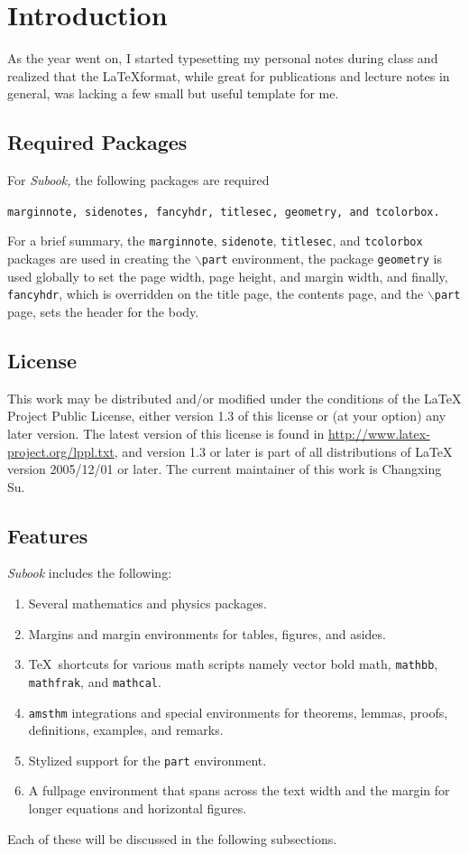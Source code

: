 \chapter{Introduction}
As the year went on, I started typesetting my personal notes during class and realized that the \LaTeX  format, 
while great for publications and lecture notes in general, was lacking a few small but useful template for me.

\section{Required Packages}\label{sec:reqpackages}
For \textit{Subook,} the following packages are required
\begin{center}
    \texttt{marginnote, sidenotes, fancyhdr, titlesec, geometry, and tcolorbox.}
\end{center}
For a brief summary, the \texttt{marginnote}, \texttt{sidenote}, \texttt{titlesec}, 
and \texttt{tcolorbox} packages are used in creating the \texttt{$\backslash$part} environment, 
the package \texttt{geometry} is used globally to set the page width, page height, 
and margin width, and finally, \texttt{fancyhdr}, 
which is overridden on the title page, 
the contents page, and the \texttt{$\backslash$part} page, sets the header for the body.


\section{License}\label{sec:license}
This work may be distributed and/or modified under the conditions of the LaTeX Project Public License, 
either version 1.3 of this license or (at your option) any later version. 
The latest version of this license is found in  \url{http://www.latex-project.org/lppl.txt}, 
and version 1.3 or later is part of all distributions of LaTeX version 2005/12/01 or later. 
The current maintainer of this work is Changxing Su.

\section{Features}\label{sec:Features}

\textit{Subook} includes the following:
	\begin{enumerate}
		\item Several mathematics and physics packages.
		\item Margins and margin environments for tables, figures, and asides.
		\item \TeX\ shortcuts for various math scripts namely vector bold math, \texttt{mathbb}, \texttt{mathfrak}, and \texttt{mathcal}.
		\item \texttt{amsthm} integrations and special environments for theorems, lemmas, proofs, definitions, examples, and remarks.\
		\item Stylized support for the \texttt{part} environment.
		\item A fullpage environment that spans across the text width and the margin for longer equations and horizontal figures.
	\end{enumerate}
    Each of these will be discussed in the following subsections.


